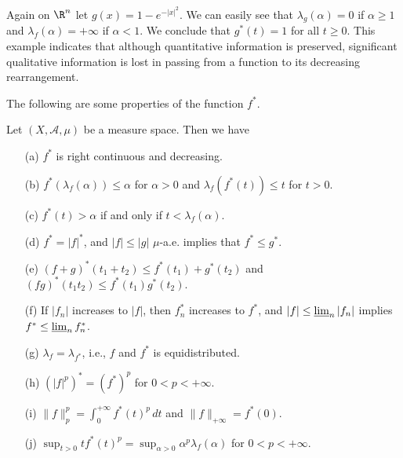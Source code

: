 \begin{example}
Again on $\R^n$ let $g(x)=1-e^{-|x|^2}$. We can easily see that $\lambda_g(\alpha)=0$ if $\alpha\geq 1$ and $\lambda_f(\alpha)=+\infty$ if $\alpha<1$. We conclude that $g^*(t)=1$ for all $t\geq 0$. This example indicates that although quantitative information is preserved, significant qualitative information is lost in passing from a function to its decreasing rearrangement.
\end{example}
The following are some properties of the function $f^*$.
\begin{proposition}\label{decreasing rearrangement prop}
Let $(X,\mathcal{A},\mu)$ be a measure space. Then we have
\begin{itemize}
\item[(a)] $f^*$ is right continuous and decreasing.
\item[(b)] $f^*(\lambda_f(\alpha))\leq\alpha$ for $\alpha>0$ and $\lambda_f(f^*(t))\leq t$ for $t>0$.
\item[(c)] $f^*(t)>\alpha$ if and only if $t<\lambda_f(\alpha)$.
\item[(d)] $f^*=|f|^*$, and $|f|\leq|g|$ $\mu$-a.e. implies that $f^*\leq g^*$.
\item[(e)] $(f+g)^*(t_1+t_2)\leq f^*(t_1)+g^*(t_2)$ and $(fg)^*(t_1t_2)\leq f^*(t_1)g^*(t_2)$.
\item[(f)] If $|f_n|$ increases to $|f|$, then $f_n^*$ increases to $f^*$, and $|f|\leq\varliminf_n|f_n|$ implies $f^*\leq\varliminf_nf_n^*$.
\item[(g)] $\lambda_f=\lambda_{f^*}$, i.e., $f$ and $f^*$ is equidistributed. 
\item[(h)] $(|f|^p)^*=(f^*)^p$ for $0<p<+\infty$.
\item[(i)] $\|f\|_p^p=\int_{0}^{+\infty}f^*(t)^p\,dt$ and $\|f\|_{+\infty}=f^*(0)$.
\item[(j)] $\sup_{t>0}tf^*(t)^p=\sup_{\alpha>0}\alpha^p\lambda_f(\alpha)$ for $0<p<+\infty$.   
\end{itemize}
\end{proposition}

